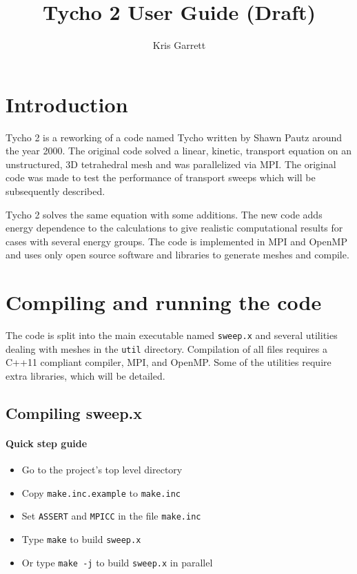 \documentclass[12pt,letterpaper]{article}
\author{Kris Garrett}
\title{Tycho 2 User Guide (Draft)}
\begin{document}
\maketitle


\section{Introduction}
Tycho 2 is a reworking of a code named Tycho written by Shawn Pautz around the year 2000.
The original code solved a linear, kinetic, transport equation on an unstructured, 3D tetrahedral mesh and was parallelized via MPI.
The original code was made to test the performance of transport sweeps which will be subsequently described.

Tycho 2 solves the same equation with some additions.
The new code adds energy dependence to the calculations to give realistic computational results for cases with several energy groups.
The code is implemented in MPI and OpenMP and uses only open source software and libraries to generate meshes and compile.







\section{Compiling and running the code}
The code is split into the main executable named {\tt sweep.x} and several utilities dealing with meshes in the {\tt util} directory.
Compilation of all files requires a C++11 compliant compiler, MPI, and OpenMP.
Some of the utilities require extra libraries, which will be detailed.


\subsection{Compiling sweep.x}
\paragraph{Quick step guide}
\begin{itemize}
\item Go to the project's top level directory
\item Copy {\tt make.inc.example} to {\tt make.inc}
\item Set {\tt ASSERT} and {\tt MPICC} in the file {\tt make.inc}
\item Type {\tt make} to build {\tt sweep.x}
\item Or type {\tt make -j} to build {\tt sweep.x} in parallel
\end{itemize}
\end{document}
